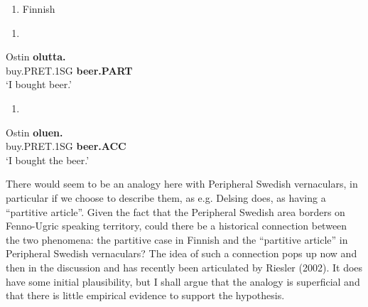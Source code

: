 \begin{enumerate} %
\item 
Finnish

\end{enumerate} %
\setcounter{listLFOxcviiileveli}{0}
\begin{enumerate} %
\item 
\end{enumerate} %
\ea\label{}
\gll Ostin  \textbf{olutta.}\\


buy.PRET.1SG  \textbf{beer.PART}\\ %


‘I bought beer.’
\z


\begin{enumerate} %
\item 
\end{enumerate} %
\ea\label{}
\gll Ostin  \textbf{oluen.}\\


buy.PRET.1SG  \textbf{beer.ACC}\\ %


 ‘I bought the beer.’
\z


There would seem to be an analogy here with Peripheral Swedish vernaculars, in particular if we choose to describe them, as e.g. Delsing does, as having a “partitive article”. Given the fact that the Peripheral Swedish area borders on Fenno-Ugric speaking territory, could there be a historical connection between the two phenomena: the partitive case in Finnish and the “partitive article” in Peripheral Swedish vernaculars? The idea of such a connection pops up now and then in the discussion and has recently been articulated by Riesler (2002). It does have some initial plausibility, but I shall argue that the analogy is superficial and that there is little empirical evidence to support the hypothesis.

